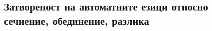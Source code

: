 

        
        

\subsection*{Затвореност на автоматните езици относно сечиение, обединение, разлика}

